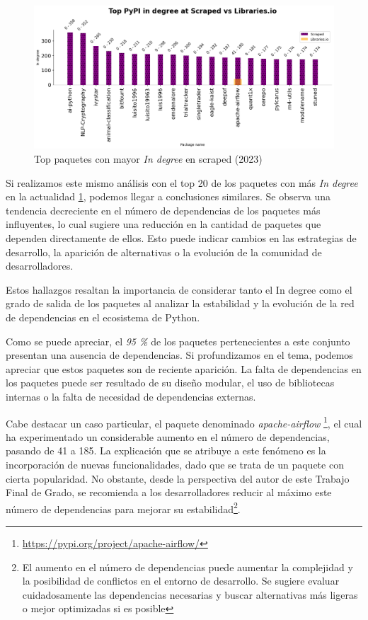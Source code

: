 \begin{figure}[ht!]
    \begin{center}
        \includegraphics[width=1\textwidth]{img/pypi/scraped_t20_ind_comparison.png}
        \caption{Top paquetes con mayor \textit{In degree} en scraped (2023)}
        \label{fig:pypi_scraped_ind_comparison}
    \end{center}
\end{figure}

Si realizamos este mismo análisis con el top 20 de los paquetes con más \textit{In degree} en la
actualidad \ref{fig:pypi_scraped_ind_comparison}, podemos llegar a
conclusiones similares. Se observa una tendencia decreciente en el número de dependencias de los paquetes
más influyentes, lo cual sugiere una reducción en la cantidad de paquetes que dependen directamente de ellos.
Esto puede indicar cambios en las estrategias de desarrollo, la aparición de alternativas o la evolución de la
comunidad de desarrolladores.

Estos hallazgos resaltan la importancia de considerar tanto el In degree como el grado de salida de
los paquetes al analizar la estabilidad y la evolución de la red de dependencias en el ecosistema de Python.

Como se puede apreciar, el \textit{95 \%} de los paquetes pertenecientes a este conjunto presentan una ausencia
de dependencias.
Si profundizamos en el tema, podemos apreciar que estos paquetes son de reciente aparición. La falta de
dependencias en los paquetes puede ser resultado de su diseño modular, el uso de
bibliotecas internas o la falta de necesidad de dependencias externas.

Cabe destacar un caso particular, el paquete denominado \textit{apache-airflow}
\footnote{\url{https://pypi.org/project/apache-airflow/}}, el cual ha experimentado un considerable aumento
en el número de dependencias, pasando de 41 a 185. La explicación que se atribuye a este fenómeno es la
incorporación de nuevas funcionalidades, dado que se trata de un paquete con cierta popularidad. No obstante,
desde la perspectiva del autor de este Trabajo Final de Grado, se recomienda a los desarrolladores reducir
al máximo este número de dependencias para mejorar su estabilidad\footnote{El aumento en el número de dependencias
    puede aumentar la complejidad y la posibilidad de conflictos en el entorno de desarrollo. Se sugiere evaluar
    cuidadosamente las dependencias necesarias y buscar alternativas más ligeras o mejor optimizadas si es posible}.


